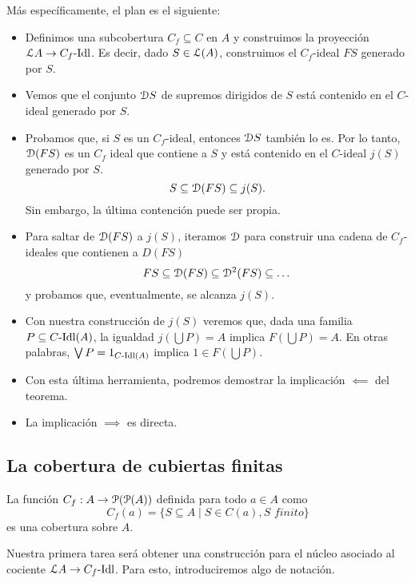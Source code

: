 Más específicamente, el plan es el siguiente:
\begin{itemize}
    \item
    Definimos una subcobertura $C_f\subseteq C$ en $A$ y
    construimos la proyección $\cal LA\to C_f\Idl$.
    Es decir, dado $S\in\cal L(A)$,
    construimos el $C_f$-ideal $FS$ generado por $S$.
    \item 
    Vemos que el conjunto $\cal DS$ de supremos dirigidos
    de $S$ está contenido en el $C$-ideal generado por $S$.
    \item
    Probamos que, si $S$ es un $C_f$-ideal, entonces
    $\cal DS$ también lo es.
    Por lo tanto, $\cal D(FS)$ es un $C_f$ ideal que
    contiene a $S$ y está contenido en el $C$-ideal $j(S)$
    generado por $S$.
    \[
        S\subseteq \cal D(FS) \subseteq j(S)
    .\]
    Sin embargo, la última contención puede ser propia.
    \item
    Para saltar de $\cal D(FS)$ a $j(S)$,
    iteramos $\cal D$ para construir una
    cadena de $C_f$-ideales que contienen a $D(FS)$
    \[
        FS\subseteq \cal D(FS) \subseteq \cal D^2(FS)
        \subseteq \dots
    \]
    y probamos que, eventualmente, se alcanza $j(S)$.
    \item
    Con nuestra construcción de $j(S)$ veremos
    que, dada una familia $P\subseteq C\Idl(A)$,
    la igualdad
    $j(\bigcup P)=A$ implica $F(\bigcup P)=A$.
    En otras palabras,
    $\Sup P = 1_{C\Idl(A)}$ implica $1\in F(\bigcup P)$.
    \item
    Con esta última herramienta, podremos demostrar
    la implicación $\impliedby$ del teorema.
    \item
    La implicación $\implies$ es directa.
\end{itemize}

\subsection{La cobertura de cubiertas finitas}

\begin{lemma}
La función $C_f:A\to\cal P(\cal P(A))$
definida para todo $a\in A$ como
\[C_f(a)=\{S\subseteq A\mid S\in C(a), S\textit{ finito}\}\]
es una cobertura sobre $A$.
\end{lemma}

Nuestra primera tarea será obtener una construcción para
el núcleo asociado al cociente $\cal LA\to C_f\Idl$.
Para esto, introduciremos algo de notación.

